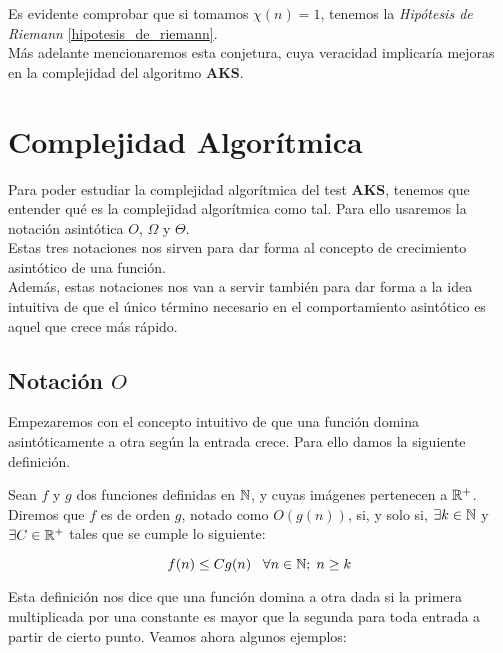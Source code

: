 Es evidente comprobar que si tomamos $\chi(n) = 1$, tenemos la \textit{Hipótesis de Riemann} \ref{hipotesis_de_riemann}.\\

Más adelante mencionaremos esta conjetura, cuya veracidad implicaría mejoras en la complejidad del algoritmo \textbf{AKS}.

\section{Complejidad Algorítmica}

Para poder estudiar la complejidad algorítmica del test \textbf{AKS}, tenemos que entender qué es la complejidad algorítmica como tal. Para ello usaremos la notación asintótica $O$, $\Omega$ y $\Theta$.\\

Estas tres notaciones nos sirven para dar forma al concepto de crecimiento asintótico de una función.\\

Además, estas notaciones nos van a servir también para dar forma a la idea intuitiva de que el único término necesario en el comportamiento asintótico es aquel que crece más rápido.

\subsection{Notación $O$}

Empezaremos con el concepto intuitivo de que una función domina asintóticamente a otra según la entrada crece. Para ello damos la siguiente definición.

\begin{definicion}
	Sean $f$ y $g$ dos funciones definidas en $\mathbb{N}$, y cuyas imágenes pertenecen a $\mathbb{R}^+$. Diremos que $f$ es de orden $g$, notado como $O(g(n))$, si, y solo si, $\exists k \in \mathbb{N}$ y $\exists C \in \mathbb{R}^+$ tales que se cumple lo siguiente:
	
	$$f(n) \leq Cg(n) \;\;\;\forall n \in \mathbb{N};\; n \geq k$$
\end{definicion}

Esta definición nos dice que una función domina a otra dada si la primera multiplicada por una constante es mayor que la segunda para toda entrada a partir de cierto punto. Veamos ahora algunos ejemplos:

